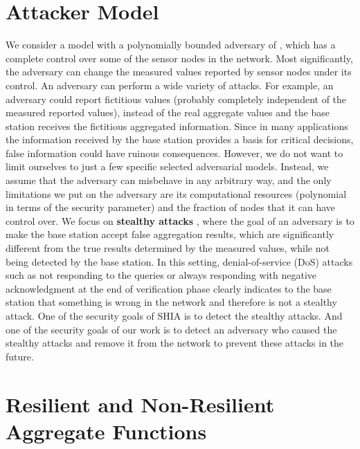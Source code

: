 \section{Attacker Model}
	
	We consider a model with a polynomially bounded adversary of \cite{przydatek2003sia}, which has a complete control over some of the sensor nodes in the network.
	Most significantly, the adversary can change the measured values reported by sensor nodes under its control.
	An adversary can perform a wide variety of attacks.
	For example, an adversary could report fictitious values (probably completely independent of the measured reported values), instead of the real aggregate values and the base station receives the fictitious aggregated information. 
	Since in many applications the information received by the base station provides a basis for critical decisions, false information could have ruinous consequences.
	However, we do not want to limit ourselves to just a few specific selected adversarial models. 
	Instead, we assume that the adversary can misbehave in any arbitrary way, and the only limitations we put on the adversary are its computational resources (polynomial in terms of the security parameter) and the fraction of nodes that it can have control over. 
	We focus on \textbf{stealthy attacks} \cite{przydatek2003sia}, where the goal of an adversary is to make the base station accept false aggregation results, which are significantly different from the true results determined by the measured values, while not being detected by the base station.
	In this setting, denial-of-service (DoS) attacks such as not responding to the queries or always responding with negative acknowledgment at the end of verification phase clearly indicates to the base station that something is wrong in the network and therefore is not a stealthy attack.
	One of the security goals of SHIA is to detect the stealthy attacks.
	And one of the security goals of our work is to detect an adversary who caused the stealthy attacks and remove it from the network to prevent these attacks in the future.
	
\section{Resilient and Non-Resilient Aggregate Functions}
	
